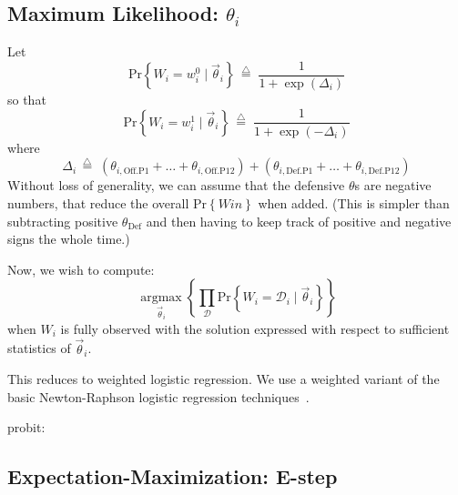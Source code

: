\documentclass[10pt,twocolumn]{article}
\newcommand{\argmax}[2]{\ensuremath{   \underset{#1}{\operatorname{argmax}} \left\{ #2 \right\}  }}
\newcommand{\prb}[1]{\ensuremath{  \mathrm{Pr}\left\{ #1 \right\}  }}
\newcommand{\tridefeq}{\ensuremath{  \,{\overset{\triangle}{=}}\;   }}
\begin{document}
\subsection{Maximum Likelihood: $\theta_i$}

Let
\[
\prb{W_i = w_i^0 \mid \vec \theta_i}
 \tridefeq \frac{1}
{1 + \exp\left(\Delta_i \right) }
\]%
so that
\[
\prb{W_i = w_i^1 \mid \vec \theta_i}
 \tridefeq \frac{1}
{1 + \exp\left(- \Delta_i \right) }
\]%
where
\[
\Delta_i \tridefeq
   \left(\theta_{i,\mathrm{Off.P1}} + \ldots + \theta_{i,\mathrm{Off.P12}}\right)
 + \left(\theta_{i,\mathrm{Def.P1}} + \ldots + \theta_{i,\mathrm{Def.P12}}\right)
\]%
Without loss of generality, we can assume that the defensive $\theta$s are negative numbers, that reduce the overall $\prb{Win}$ when added.
(This is simpler than subtracting positive $\theta_{\mathrm{Def}}$ and then having to keep track of positive and negative signs the whole time.)

Now, we wish to compute:
\[
\argmax{\vec \theta_i}{ \prod_{\mathcal{D}} \prb{W_i = \mathcal{D}_i \mid \vec \theta_i}  }
\]%
when $W_i$ is fully observed with the solution expressed with respect to sufficient statistics of $\vec \theta_i$.

This reduces to weighted logistic regression.
We use a weighted variant of the basic Newton-Raphson logistic regression techniques~\cite{statPsuJialiStat597eNotes2Logit}.


probit:
\cite{demidenko2001computational}



\subsection{Expectation-Maximization: E-step}
\end{document}
